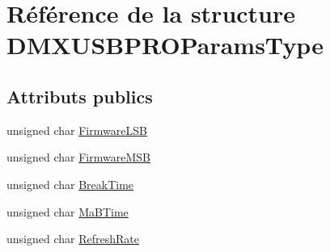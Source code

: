 \hypertarget{struct_d_m_x_u_s_b_p_r_o_params_type}{\section{Référence de la structure D\-M\-X\-U\-S\-B\-P\-R\-O\-Params\-Type}
\label{struct_d_m_x_u_s_b_p_r_o_params_type}
}
\subsection*{Attributs publics}
\begin{DoxyCompactItemize}
\item 
unsigned char \hyperlink{struct_d_m_x_u_s_b_p_r_o_params_type_aafb2113e09068d2c2d90d4254e57e580}{Firmware\-L\-S\-B}
\item 
unsigned char \hyperlink{struct_d_m_x_u_s_b_p_r_o_params_type_a545afd72b346f85996c1ae3d0b35a0ef}{Firmware\-M\-S\-B}
\item 
unsigned char \hyperlink{struct_d_m_x_u_s_b_p_r_o_params_type_a86773af46c2e39c7b260ce1f09ca0a36}{Break\-Time}
\item 
unsigned char \hyperlink{struct_d_m_x_u_s_b_p_r_o_params_type_a1ab62801637fe44bba062f2bfa54e38e}{Ma\-B\-Time}
\item 
unsigned char \hyperlink{struct_d_m_x_u_s_b_p_r_o_params_type_a6258e9923d9bc0725d4b2cc0be515d70}{Refresh\-Rate}
\end{DoxyCompactItemize}


